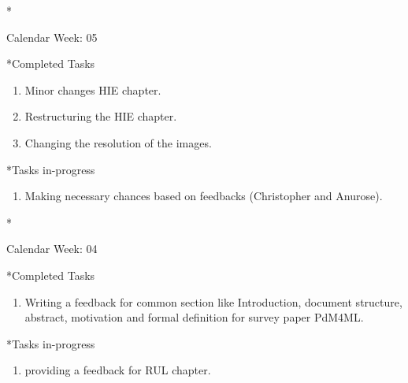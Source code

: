 \documentclass[11pt,a4paper]{article}
\begin{document}
\newpage
\begin{section}*{Calendar Week: 05 \hfill \date{05 February, 2021}}

    \begin{subsection}*{Completed Tasks}
        \begin{enumerate}
            \item
                Minor changes HIE chapter.
            \item 
                Restructuring the HIE chapter.
            \item 
                Changing the resolution of the images.
        \end{enumerate}
    \end{subsection}
    
    \begin{subsection}*{Tasks in-progress}
        \begin{enumerate}
            \item Making necessary chances based on feedbacks (Christopher and Anurose).
        \end{enumerate}
    \end{subsection}
\end{section}

\newpage
\begin{section}*{Calendar Week: 04 \hfill \date{29 January, 2021}}

    \begin{subsection}*{Completed Tasks}
        \begin{enumerate}
            \item
                Writing a feedback for common section like Introduction, document structure, abstract, motivation and formal definition for survey paper PdM4ML.
        \end{enumerate}
    \end{subsection}
    
    \begin{subsection}*{Tasks in-progress}
        \begin{enumerate}
            \item providing a feedback for RUL chapter.
        \end{enumerate}
    \end{subsection}
\end{section}
\end{document}
